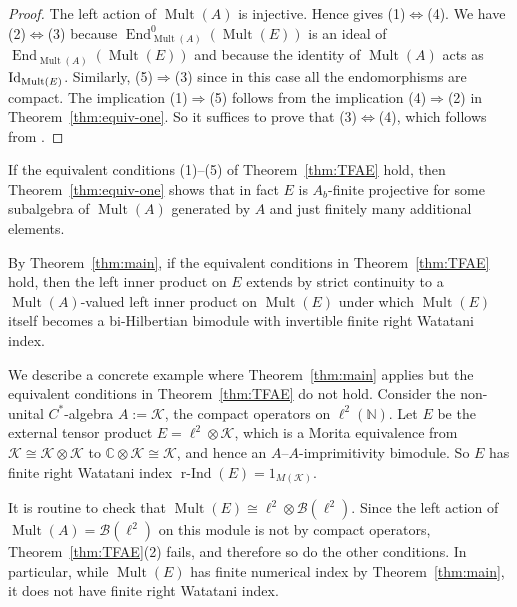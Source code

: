 \documentclass[pdftex]{sigma}
\numberwithin{equation}{section}
\DeclareMathOperator{\End}{End} %
\DeclareMathOperator{\Mult}{Mult} %
\newcommand{\rInd}{\operatorname{\mbox{$r$-$\operatorname{Ind}$}}}
\newcommand{\C}{\mathbb{C}} %
\newcommand{\K}{\mathcal{K}} %
\newcommand{\N}{\mathbb{N}} %
\begin{document}
\begin{proof} The left action of $\Mult(A)$ is injective. Hence \cite[Corollaries~2.20 and~2.28]{KajPinWat} gives \mbox{(1)\;$\Leftrightarrow$\;(4)}. We have
\mbox{(2)\;$\Leftrightarrow$\;(3)} because $\End_{\Mult(A)}^0(\Mult(E))$ is an ideal of $\End_{\Mult(A)}(\Mult(E))$ and because the identity of $\Mult(A)$ acts as ${\rm Id}_{\Mult(E)}$. Similarly, \mbox{(5)\;$\Rightarrow$\;(3)} since in this case all the endomorphisms are compact. The implication \mbox{(1)\;$\Rightarrow$\;(5)} follows from the implication \mbox{(4)\;$\Rightarrow$\;(2)} in Theorem~\ref{thm:equiv-one}. So it suf\/f\/ices to prove that \mbox{(3)\;$\Leftrightarrow$\;(4)}, which follows from \cite[Theorem~2.22]{KajPinWat}.
\end{proof}

\begin{rmk}If the equivalent conditions (1)--(5) of Theorem~\ref{thm:TFAE} hold, then Theorem~\ref{thm:equiv-one} shows that in fact $E$ is $A_b$-f\/inite projective for some subalgebra of $\Mult(A)$ generated by $A$ and just f\/initely many additional elements.
\end{rmk}

\begin{rmk} By Theorem~\ref{thm:main}, if the equivalent conditions in Theorem~\ref{thm:TFAE} hold, then the left inner product on $E$ extends by strict continuity to a $\Mult(A)$-valued left inner product on $\Mult(E)$ under which $\Mult(E)$ itself becomes a bi-Hilbertian bimodule with invertible f\/inite right Watatani index.
\end{rmk}

\begin{Example}We describe a concrete example where Theorem~\ref{thm:main} applies but the equivalent conditions in Theorem~\ref{thm:TFAE} do not hold. Consider the non-unital $C^*$-algebra $A := \K$, the compact operators on $\ell^2(\N)$. Let $E$ be the external tensor product $E = \ell^2 \otimes \K$, which is a Morita equivalence from $\K \cong \K \otimes \K$ to $\C \otimes \K \cong \K$, and hence an $A$--$A$-imprimitivity bimodule. So $E$ has f\/inite right Watatani index $\rInd(E) = 1_{M(\K)}$.

It is routine to check that $\Mult(E) \cong \ell^2 \otimes \mathcal{B}(\ell^2)$. Since the left action of $\Mult(A) = \mathcal{B}(\ell^2)$ on this module is not by compact operators, Theo\-rem~\ref{thm:TFAE}(2) fails, and therefore so do the other conditions. In particular, while $\Mult(E)$ has f\/inite numerical index by Theorem~\ref{thm:main}, it does not have f\/inite right Watatani index.
\end{Example}
\end{document}
